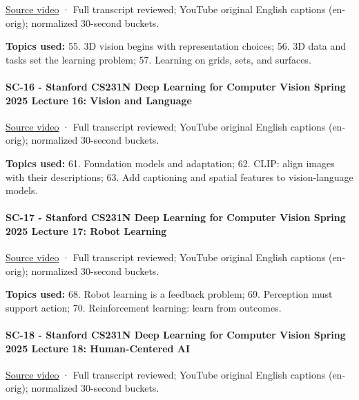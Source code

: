 \href{https://www.youtube.com/watch?v=7lxrKDKtykM}{Source video} · Full transcript reviewed; YouTube original English captions (en-orig); normalized 30-second buckets.

\textbf{Topics used:} 55. 3D vision begins with representation choices; 56. 3D data and tasks set the learning problem; 57. Learning on grids, sets, and surfaces.

\paragraph{SC-16 - Stanford CS231N Deep Learning for Computer Vision Spring 2025 Lecture 16: Vision and Language}\label{sc-16---stanford-cs231n-deep-learning-for-computer-vision-spring-2025-lecture-16-vision-and-language}

\href{https://www.youtube.com/watch?v=mQOK0Mfyrkk}{Source video} · Full transcript reviewed; YouTube original English captions (en-orig); normalized 30-second buckets.

\textbf{Topics used:} 61. Foundation models and adaptation; 62. CLIP: align images with their descriptions; 63. Add captioning and spatial features to vision-language models.

\paragraph{SC-17 - Stanford CS231N Deep Learning for Computer Vision Spring 2025 Lecture 17: Robot Learning}\label{sc-17---stanford-cs231n-deep-learning-for-computer-vision-spring-2025-lecture-17-robot-learning}

\href{https://www.youtube.com/watch?v=XSfmOH_xVSU}{Source video} · Full transcript reviewed; YouTube original English captions (en-orig); normalized 30-second buckets.

\textbf{Topics used:} 68. Robot learning is a feedback problem; 69. Perception must support action; 70. Reinforcement learning: learn from outcomes.

\paragraph{SC-18 - Stanford CS231N Deep Learning for Computer Vision Spring 2025 Lecture 18: Human-Centered AI}\label{sc-18---stanford-cs231n-deep-learning-for-computer-vision-spring-2025-lecture-18-human-centered-ai}

\href{https://www.youtube.com/watch?v=g8UaBfj6Sh8}{Source video} · Full transcript reviewed; YouTube original English captions (en-orig); normalized 30-second buckets.

